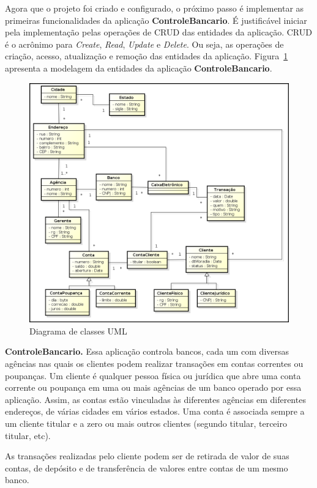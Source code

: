 \vspace{0.5cm}

Agora que o  projeto foi criado e configurado, o próximo  passo é implementar as
primeiras funcionalidades da aplicação {\bf ControleBancario}.  É justificável iniciar pela implementação  pelas operações de CRUD das entidades
da aplicação.  CRUD é o acrônimo para  {\it Create}, {\it Read},  {\it Update} e
{\it Delete}.  Ou  seja, as operações de criação,  acesso, atualização e remoção
das  entidades  da  aplicação.   Figura~\ref{figUML} apresenta  a  modelagem  da
entidades da aplicação {\bf ControleBancario}.

\begin{figure}[h]
\centering
\includegraphics[width=14cm]{fig/ControleBancario}
\caption{Diagrama de classes UML}
\label{figUML}
\end{figure}

\vspace{0.5cm}

\begin{cBox}
{\bf  ControleBancario.} Essa aplicação  controla bancos,  cada um  com diversas
agências nas quais os clientes  podem realizar transações em contas correntes ou
poupanças. Um  cliente é qualquer pessoa  física ou jurídica que  abre uma conta
corrente  ou poupança  em uma  ou mais  agências de  um banco  operado  por essa
aplicação. Assim,  as  contas   estão  vinculadas  às  diferentes  agências  em
diferentes  endereços,  de  várias  cidades  em vários  estados.   Uma  conta  é
associada sempre a um cliente titular  e a zero ou mais outros clientes (segundo
titular, terceiro titular, etc). 

As transações  realizadas pelo cliente  podem ser de  retirada de valor  de suas
contas, de depósito e de transferência de valores entre contas de um mesmo banco.
\end{cBox}

